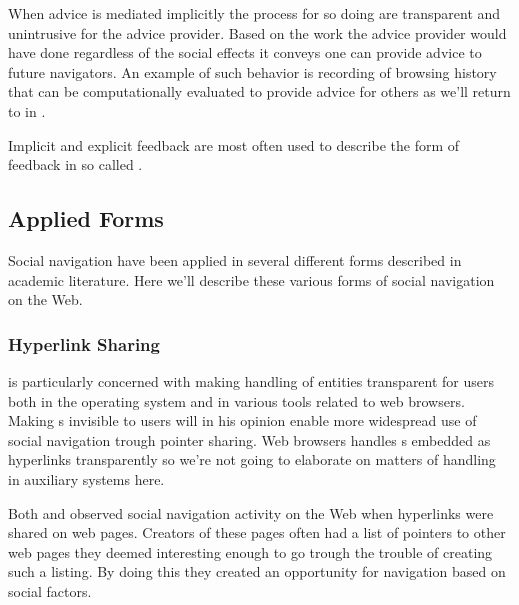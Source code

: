 When advice is mediated implicitly the process for so doing are transparent
and unintrusive for the advice provider. Based on the work the advice provider
would have done regardless of the social effects it conveys one can provide
advice to future navigators. An example of such behavior is recording of
browsing history that can be computationally evaluated to provide advice for
others as we'll return to in
.

Implicit and explicit feedback are most often used to
describe the form of feedback in so called %
\citep[]{oard98}.



\subsection{Applied Forms}

Social navigation have been applied in several different forms described in
academic literature. Here we'll describe these various forms of social
navigation on the Web.

\subsubsection{Hyperlink Sharing}

\citet{dieberger97} is particularly concerned with making handling of
%
entities transparent for users both in the operating system and in various
tools related to web browsers. Making s invisible to users will in
his opinion enable more widespread use of social navigation trough pointer
sharing. Web browsers handles s embedded as hyperlinks transparently
so we're not going to elaborate on matters of  handling in
auxiliary systems here.

Both \cite{dourish94} and \cite{dieberger97} observed social navigation
activity on the
Web when hyperlinks were shared on web pages. Creators of these pages often
had a list of pointers to other web pages they deemed interesting enough to go
trough the trouble of creating such a listing. By doing this they created
an opportunity for navigation based on social factors.

